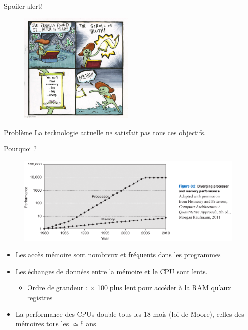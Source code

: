 \documentclass[8pt]{beamer}
\begin{document}
\begin{frame}{Spoiler alert!}
    \begin{figure}
        \centering
        \includegraphics[width=0.5\textwidth]{figures/meme.jpg}
        \label{fig:memory_speed}
    \end{figure}

    \begin{alertblock}{Problème}
        La technologie actuelle ne satisfait pas tous ces objectifs.
    \end{alertblock}
\end{frame}

\begin{frame}{Pourquoi ?}
    \begin{figure}[ht]
        \centering
        \centering
        \includegraphics[width=.75\linewidth]{figures/gap_cpu_ram_H.png}
        \label{fig:sub2}
    \end{figure}
    \begin{itemize}
        \item Les acc\`es mémoire sont nombreux et fréquents dans les
              programmes
        \item Les \'echanges de données entre la mémoire et le CPU sont lents.
              \begin{itemize}
                  \item Ordre de grandeur : $\times$ 100 plus lent pour accéder
                        à la RAM qu'aux registres
              \end{itemize}
        \item La performance des CPUs double tous les 18 mois (loi de Moore),
              celles des mémoires tous les $\simeq5$ ans
    \end{itemize}
\end{frame}
\end{document}
